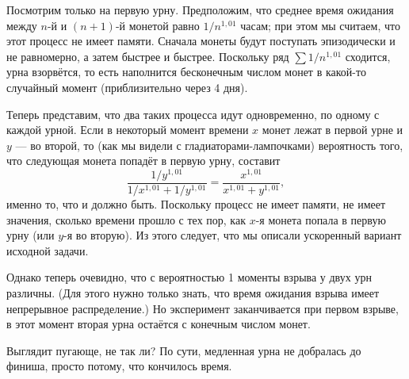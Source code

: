 \medskip

Посмотрим только на первую урну.
Предположим, что среднее время ожидания между $n$-й и $(n+1)$-й монетой равно 
$1/n^{1{,}01}$ часам; при этом мы считаем, что этот процесс не имеет памяти.
Сначала монеты будут поступать эпизодически и не равномерно, а затем быстрее и быстрее.
Поскольку ряд $\sum 1/n^{1{,}01}$ сходится, урна взорвётся, то есть наполнится бесконечным числом монет в какой-то случайный момент (приблизительно через 4 дня).

Теперь представим, что два таких процесса идут одновременно, по одному с каждой урной.
Если в некоторый момент времени $x$ монет лежат в первой урне и $y$ --- во второй, то (как мы видели с гладиаторами-лампочками) 
вероятность того, что следующая монета попадёт в первую урну, составит
\[\frac{1/y^{1{,}01}}{1/x^{1{,}01}+1/y^{1{,}01}}=\frac{x^{1{,}01}}{x^{1{,}01}+y^{1{,}01}},\]
именно то, что и должно быть.
Поскольку процесс не имеет памяти,
не имеет значения, сколько времени прошло с тех пор, как $x$-я монета попала в первую урну (или $y$-я во вторую).
Из этого следует, что мы описали ускоренный вариант исходной задачи.

Однако теперь очевидно, что с вероятностью 1 моменты взрыва у двух урн различны.
(Для этого нужно только знать, что время ожидания взрыва имеет непрерывное распределение.)
Но эксперимент заканчивается при первом взрыве, в этот момент вторая урна остаётся с конечным числом монет.\heart

Выглядит пугающе, не так ли?
По сути, медленная урна не добралась до финиша, просто потому, что кончилось время.
